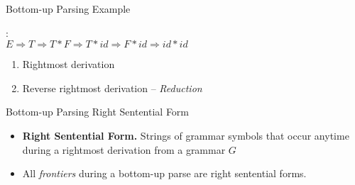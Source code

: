\documentclass{beamer}
\begin{document}
\begin{frame}{Bottom-up Parsing}
{Example}

\begin{center}

\end{center}

: \\
$E \Rightarrow T\Rightarrow T * F \Rightarrow T * id \Rightarrow F * id \Rightarrow id * id$

\begin{enumerate}
	\pause
	\item Rightmost derivation
	\pause
	\item Reverse rightmost derivation -- \emph{Reduction}
\end{enumerate}
\end{frame}

\begin{frame}{Bottom-up Parsing}
{Right Sentential Form}
\begin{itemize}
	\item \textbf{Right Sentential Form.} Strings of grammar symbols that occur anytime during a rightmost derivation from a grammar $G$
	\item All \emph{frontiers} during a bottom-up parse are right sentential forms.  
\end{itemize}
\end{frame}
\end{document}
